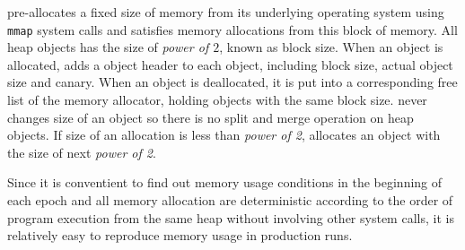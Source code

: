 \DoubleTake{} pre-allocates a fixed size of memory 
from its underlying operating system using \texttt{mmap} system calls and 
satisfies memory allocations from this block of memory.
All heap objects has the size of {\it power of $2$}, known as block size. 
When an object is allocated, \doubletake{} adds a object header to each object, including block size,
actual object size and canary.
When an object is deallocated, it is put into a corresponding free list of the memory allocator, 
holding objects with the same block size. 
\DoubleTake{} never changes size of an object so there is no split and merge operation on heap objects.
If size of an allocation is less than {\it power of 2}, 
\DoubleTake{} allocates an object with the size of next {\it power of 2}.

Since it is conventient to find out memory usage conditions in the beginning of each epoch 
and all memory allocation are deterministic according to the order of program execution from the same heap without involving other system calls,  
it is relatively easy to reproduce memory usage in production runs.


